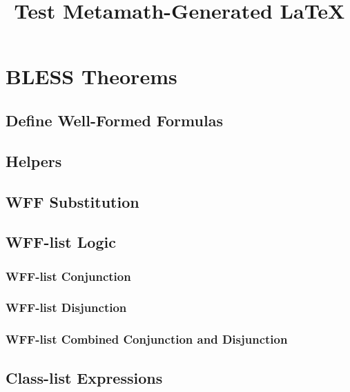 \documentclass[fleqn,openany]{book}
\title{Test Metamath-Generated LaTeX}
\begin{document}
\maketitle

\tableofcontents 

\listoffigures

\listoftables

\listofexamples

\listofrules
\listofmath

\chapter{BLESS Theorems}

\section{Define Well-Formed Formulas}


\section{Helpers}


\section{WFF Substitution}


\section{WFF-list Logic}
\subsection{WFF-list Conjunction}

\subsection{WFF-list Disjunction}

\subsection{WFF-list Combined Conjunction and Disjunction}



\section{Class-list Expressions}
\end{document}

